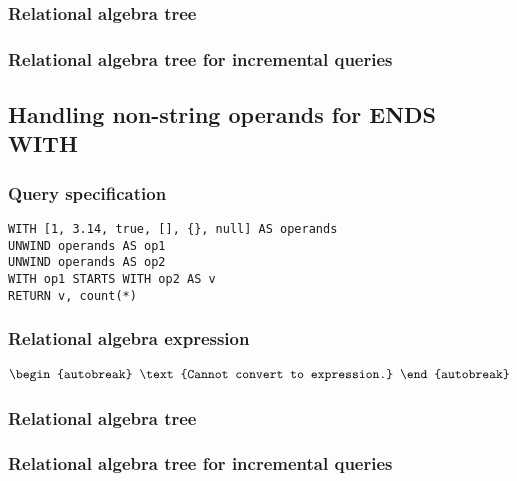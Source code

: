 \subsubsection*{Relational algebra tree}


\subsubsection*{Relational algebra tree for incremental queries}


\subsection{Handling non-string operands for ENDS WITH}

\subsubsection*{Query specification}

\begin{lstlisting}
WITH [1, 3.14, true, [], {}, null] AS operands
UNWIND operands AS op1
UNWIND operands AS op2
WITH op1 STARTS WITH op2 AS v
RETURN v, count(*)
\end{lstlisting}

\subsubsection*{Relational algebra expression}

\begin{align*}
\begin{autobreak}
\text{Cannot convert to expression.}
\end{autobreak}
\end{align*}

\subsubsection*{Relational algebra tree}


\subsubsection*{Relational algebra tree for incremental queries}

